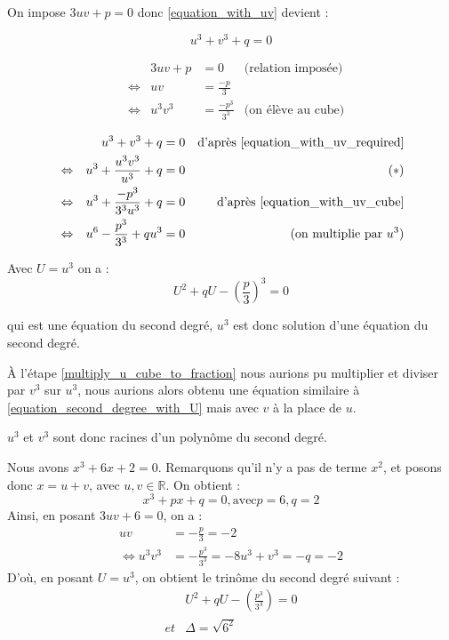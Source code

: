\documentclass[]{../templates/homework}
\begin{document}
\question On impose $3uv + p = 0$ donc \eqref{equation_with_uv} devient :

\begin{equation*}
	u^3 + v^3 + q = 0 \tag{$E_3$} \label{equation_with_uv_required}
\end{equation*}

\question

\begin{align*}
	 &                 & 3uv + p & = 0                & \text{(relation imposée)}                                           \\
	 & \Leftrightarrow & uv      & = \frac{-p}{3}     &                                                                     \\
	 & \Leftrightarrow & u^3v^3  & = \frac{-p^3}{3^3} & \text{(on élève au cube)} \tag{$E_4$} \label{equation_with_uv_cube}
\end{align*}

\question

\begin{align*}
	 &                 & u^3 + v^3 + q                 & = 0 & \text{d'après \eqref{equation_with_uv_required}} \\
	 & \Leftrightarrow & u^3 + \frac{u^3v^3}{u^3} + q  & = 0 & \tag{$\ast$} \label{multiply_u_cube_to_fraction} \\
	 & \Leftrightarrow & u^3 + \frac{-p^3}{3^3u^3} + q & = 0 & \text{d'après \eqref{equation_with_uv_cube}}     \\
	 & \Leftrightarrow & u^6 - \frac{p^3}{3^3} + qu^3  & = 0 & \text{(on multiplie par $u^3$)}
\end{align*}

Avec $U = u^3$ on a :
\begin{equation}
	\tag{$E_5$}
	U^2 + qU - \left(\frac{p}{3}\right)^3 = 0
	\label{equation_second_degree_with_U}
\end{equation}

qui est une équation du second degré, $u^3$ est donc solution d'une équation du second degré.

À l'étape \eqref{multiply_u_cube_to_fraction} nous aurions pu multiplier et diviser par $v^3$ sur $u^3$, nous aurions alors obtenu une équation similaire à \eqref{equation_second_degree_with_U} mais avec $v$ à la place de $u$.

$u^3$ et $v^3$ sont donc racines d'un polynôme du second degré.

Nous avons $x^3 + 6x + 2 =0$. Remarquons qu'il n'y a pas de terme $x^2$, et posons donc $x = u+v$, avec  $u,v \in \mathbb R$. On obtient :
$$x^3 + px + q = 0, \text{avec}  p=6, q=2$$
Ainsi, en posant $3uv + 6 = 0$, on a :
\begin{align*}
	      uv &= -\frac{p}{3} = -2 \\
	\iff u^3v^3 &= -\frac{p^3}{3^3}= -8
	u^3 + v^3 = -q = -2
\end{align*}
D'où, en posant $U = u^3$, on obtient le trinôme du second degré suivant : 
\begin{align*}
	&U^2 + qU - \left(\frac{p^3}{3^3}\right)=0 \\
	et &\Delta = \sqrt{6^2}
\end{align*}
\end{document}

